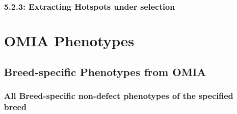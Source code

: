 \documentclass[
]{article}
\begin{document}
\subsubsection{5.2.3: Extracting Hotspots under
selection}\label{extracting-hotspots-under-selection}

\section{OMIA Phenotypes}\label{omia-phenotypes}

\subsection{Breed-specific Phenotypes from
OMIA}\label{breed-specific-phenotypes-from-omia}

\subsubsection{All Breed-specific non-defect phenotypes of the specified
breed}\label{all-breed-specific-non-defect-phenotypes-of-the-specified-breed}
\end{document}
